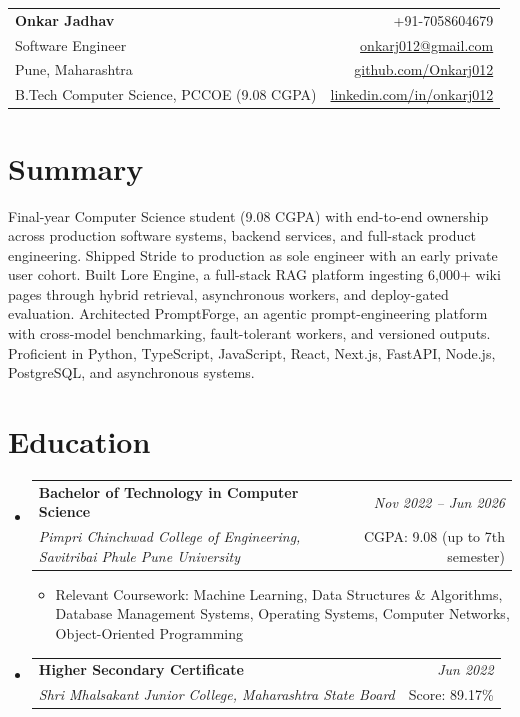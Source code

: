 \documentclass[a4paper,11pt]{article}
\makeatletter
\newcommand{\resumeSubheading}[4]{
\vspace{0.5mm}\item
    \begin{tabular*}{0.98\textwidth}[t]{l@{\extracolsep{\fill}}r}
        \textbf{#1} & \textit{\footnotesize{#4}} \\
        \textit{\footnotesize{#3}} & \footnotesize{#2}\\
    \end{tabular*}
    \vspace{-2.4mm}
}
\newcommand{\resumeSubHeadingListStart}{\begin{itemize}[leftmargin=*,labelsep=0mm]}
\newcommand{\resumeItemListStart}{\begin{justify}\begin{itemize}[leftmargin=3ex, rightmargin=2ex, noitemsep,labelsep=1.2mm,itemsep=0mm]\small}
\newcommand{\resumeSubHeadingListEnd}{\end{itemize}\vspace{2mm}}
\newcommand{\resumeItemListEnd}{\end{itemize}\end{justify}\vspace{-2mm}}
\newcommand{\name}{Onkar Jadhav}
\newcommand{\phone}{7058604679}
\newcommand{\emaila}{onkarj012@gmail.com}
\newcommand{\github}{github.com/Onkarj012}
\newcommand{\linkedin}{linkedin.com/in/onkarj012}
\makeatother
\begin{document}
\selectfont

\begin{tabularx}{\linewidth}{L r}
  \textbf{\Large \name} & {+91-\phone}\\
  {Software Engineer} & \href{mailto:\emaila}{\emaila} \\
  {Pune, Maharashtra} & \href{https://\github}{\github} \\
  {B.Tech Computer Science, PCCOE (9.08 CGPA)} & \href{https://\linkedin}{\linkedin}
\end{tabularx}
\vspace{-4mm}

\section{\textbf{Summary}}
\vspace{1mm}
\small{
Final-year Computer Science student (9.08 CGPA) with end-to-end ownership across production software systems, backend services, and full-stack product engineering. Shipped Stride to production as sole engineer with an early private user cohort. Built Lore Engine, a full-stack RAG platform ingesting 6,000+ wiki pages through hybrid retrieval, asynchronous workers, and deploy-gated evaluation. Architected PromptForge, an agentic prompt-engineering platform with cross-model benchmarking, fault-tolerant workers, and versioned outputs. Proficient in Python, TypeScript, JavaScript, React, Next.js, FastAPI, Node.js, PostgreSQL, and asynchronous systems.
}
\vspace{-3mm}

\section{\textbf{Education}}
  \resumeSubHeadingListStart
    \resumeSubheading
      {Bachelor of Technology in Computer Science}{CGPA: 9.08 (up to 7th semester)}
      {Pimpri Chinchwad College of Engineering, Savitribai Phule Pune University}{Nov 2022 -- Jun 2026}
      \resumeItemListStart
        \item {Relevant Coursework: Machine Learning, Data Structures \& Algorithms, Database Management Systems, Operating Systems, Computer Networks, Object-Oriented Programming}
      \resumeItemListEnd
    \resumeSubheading
      {Higher Secondary Certificate}{Score: 89.17\%}
      {Shri Mhalsakant Junior College, Maharashtra State Board}{Jun 2022}
  \resumeSubHeadingListEnd
\vspace{-5.5mm}
\end{document}
